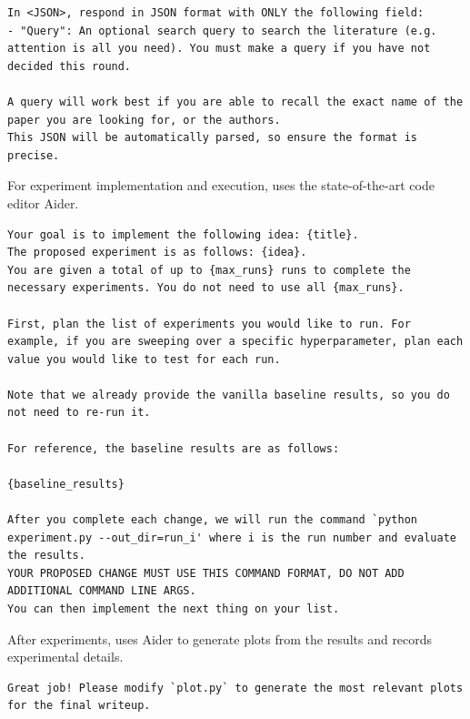 \begin{appendices}
\begin{tcolorbox}[breakable, colback=orange!5!white, colframe=orange!80!black, title=Idea Novelty Prompt]
\begin{Verbatim}[breaklines, breaksymbol={}, breaksymbolleft={}, fontsize=\small]
In <JSON>, respond in JSON format with ONLY the following field:
- "Query": An optional search query to search the literature (e.g. attention is all you need). You must make a query if you have not decided this round.

A query will work best if you are able to recall the exact name of the paper you are looking for, or the authors.
This JSON will be automatically parsed, so ensure the format is precise.
\end{Verbatim}
\end{tcolorbox}

For experiment implementation and execution, \ouralgo uses the state-of-the-art code editor Aider.
\begin{tcolorbox}[breakable, colback=orange!5!white, colframe=orange!80!black, title=Experiment Running Aider Prompt]
\begin{Verbatim}[breaklines, breaksymbol={}, breaksymbolleft={}, fontsize=\small]
Your goal is to implement the following idea: {title}.
The proposed experiment is as follows: {idea}.
You are given a total of up to {max_runs} runs to complete the necessary experiments. You do not need to use all {max_runs}.

First, plan the list of experiments you would like to run. For example, if you are sweeping over a specific hyperparameter, plan each value you would like to test for each run.

Note that we already provide the vanilla baseline results, so you do not need to re-run it.

For reference, the baseline results are as follows:

{baseline_results}

After you complete each change, we will run the command `python experiment.py --out_dir=run_i' where i is the run number and evaluate the results.
YOUR PROPOSED CHANGE MUST USE THIS COMMAND FORMAT, DO NOT ADD ADDITIONAL COMMAND LINE ARGS.
You can then implement the next thing on your list.
\end{Verbatim}
\end{tcolorbox}

After experiments, \ouralgo uses Aider to generate plots from the results and records experimental details.
\begin{tcolorbox}[breakable, colback=orange!5!white, colframe=orange!80!black, title=Plotting Aider Prompt]
\begin{Verbatim}[breaklines, breaksymbol={}, breaksymbolleft={}, fontsize=\small]
Great job! Please modify `plot.py` to generate the most relevant plots for the final writeup.


\end{Verbatim}
\end{tcolorbox}
\end{appendices}
